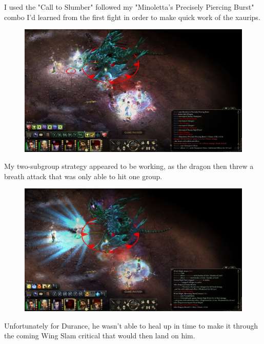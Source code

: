 \documentclass{article}
\begin{document}
I used the "Call to Slumber" followed my "Minoletta's Precisely Piercing Burst" combo I'd learned from the first fight in order to make quick work of the xaurips.

\begin{figure}
\includegraphics[scale=0.33]{files/blog/2019_03_17_pillars_of_eternity_path_of_the_damned_act_iv/2019_03_17_dragon2_06.jpg}
\end{figure}

My two-subgroup strategy appeared to be working, as the dragon then threw a breath attack that was only able to hit one group.

\begin{figure}
\includegraphics[scale=0.33]{files/blog/2019_03_17_pillars_of_eternity_path_of_the_damned_act_iv/2019_03_17_dragon2_07.jpg}
\end{figure}

Unfortunately for Durance, he wasn't able to heal up in time to make it through the coming Wing Slam critical that would then land on him.
\end{document}
